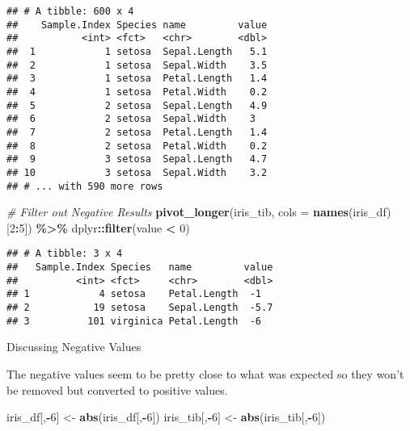 \documentclass[
]{article}
\newenvironment{Shaded}{\begin{snugshade}}{\end{snugshade}}
\newcommand{\CommentTok}[1]{\textcolor[rgb]{0.56,0.35,0.01}{\textit{#1}}}
\newcommand{\DataTypeTok}[1]{\textcolor[rgb]{0.13,0.29,0.53}{#1}}
\newcommand{\DecValTok}[1]{\textcolor[rgb]{0.00,0.00,0.81}{#1}}
\newcommand{\KeywordTok}[1]{\textcolor[rgb]{0.13,0.29,0.53}{\textbf{#1}}}
\newcommand{\NormalTok}[1]{#1}
\newcommand{\OperatorTok}[1]{\textcolor[rgb]{0.81,0.36,0.00}{\textbf{#1}}}
\newcommand{\StringTok}[1]{\textcolor[rgb]{0.31,0.60,0.02}{#1}}
\begin{document}
\begin{verbatim}
## # A tibble: 600 x 4
##    Sample.Index Species name         value
##           <int> <fct>   <chr>        <dbl>
##  1            1 setosa  Sepal.Length   5.1
##  2            1 setosa  Sepal.Width    3.5
##  3            1 setosa  Petal.Length   1.4
##  4            1 setosa  Petal.Width    0.2
##  5            2 setosa  Sepal.Length   4.9
##  6            2 setosa  Sepal.Width    3  
##  7            2 setosa  Petal.Length   1.4
##  8            2 setosa  Petal.Width    0.2
##  9            3 setosa  Sepal.Length   4.7
## 10            3 setosa  Sepal.Width    3.2
## # ... with 590 more rows
\end{verbatim}

\begin{Shaded}
\begin{Highlighting}[]
\CommentTok{\# Filter out Negative Results}
\KeywordTok{pivot\_longer}\NormalTok{(iris\_tib, }\DataTypeTok{cols =} \KeywordTok{names}\NormalTok{(iris\_df)[}\DecValTok{2}\OperatorTok{:}\DecValTok{5}\NormalTok{]) }\OperatorTok{\%>\%}\StringTok{ }
\StringTok{  }\NormalTok{dplyr}\OperatorTok{::}\KeywordTok{filter}\NormalTok{(value }\OperatorTok{<}\StringTok{ }\DecValTok{0}\NormalTok{) }
\end{Highlighting}
\end{Shaded}

\begin{verbatim}
## # A tibble: 3 x 4
##   Sample.Index Species   name         value
##          <int> <fct>     <chr>        <dbl>
## 1            4 setosa    Petal.Length  -1  
## 2           19 setosa    Sepal.Length  -5.7
## 3          101 virginica Petal.Length  -6
\end{verbatim}

Discussing Negative Values

The negative values seem to be pretty close to what was expected so they
won't be removed but converted to positive values.

\begin{Shaded}
\begin{Highlighting}[]
\NormalTok{iris\_df[,}\OperatorTok{{-}}\DecValTok{6}\NormalTok{] <{-}}\StringTok{ }\KeywordTok{abs}\NormalTok{(iris\_df[,}\OperatorTok{{-}}\DecValTok{6}\NormalTok{])}
\NormalTok{iris\_tib[,}\OperatorTok{{-}}\DecValTok{6}\NormalTok{] <{-}}\StringTok{ }\KeywordTok{abs}\NormalTok{(iris\_tib[,}\OperatorTok{{-}}\DecValTok{6}\NormalTok{])}
\end{Highlighting}
\end{Shaded}
\end{document}
